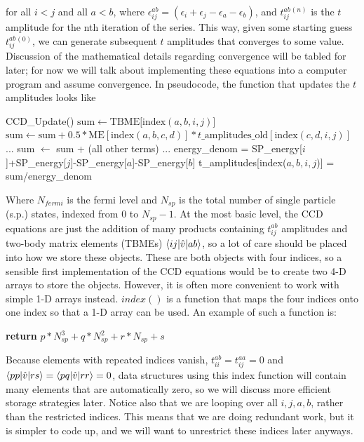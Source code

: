 for all $i < j$ and all $a < b$, where $\epsilon^{ab}_{ij} = \left(\epsilon_i+\epsilon_j-\epsilon_a-\epsilon_b\right)$, and $t_{ij}^{ab}{}^{(n)}$ is the $t$ amplitude for the nth iteration of the series. This way, given some starting guess $t_{ij}^{ab}{}^{(0)}$, we can generate subsequent $t$ amplitudes that converges to some value. Discussion of the mathematical details regarding convergence will be tabled for later; for now we will talk about implementing these equations into a computer program and assume convergence. In pseudocode, the function that updates the $t$ amplitudes looks like

\begin{algorithmic} 
\State CCD\_Update()
  \State $\text{sum} \gets \text{TBME}[\text{index}(a,b,i,j)$]
  \State $\text{sum} \gets \text{sum} + 0.5*\text{ME}[\text{index}(a,b,c,d)] * t\_\text{amplitudes}\_\text{old}[\text{index}(c,d,i,j)]$
  \EndFor
  \EndFor
  \State ...
  \State sum $\gets$ sum + (all other terms)
  \State ...
  \State energy\_denom = SP\_energy[$i$]+SP\_energy[$j$]-SP\_energy[$a$]-SP\_energy[$b$]
  \State t\_amplitudes[index($a,b,i,j$)] = sum/energy\_denom
  \EndFor
  \EndFor
  \EndFor
  \EndFor
\end{algorithmic}
Where $N_{fermi}$ is the fermi level and $N_{sp}$ is the total number of single particle (s.p.) states, indexed from 0 to $N_{sp}-1$. At the most basic level, the CCD equations are just the addition of many products containing $t_{ij}^{ab}$ amplitudes and two-body matrix elements (TBMEs) $\braket{ij|\hat{v}|ab}$, so a lot of care should be placed into how we store these objects. These are both objects with four indices, so a sensible first implementation of the CCD equations would be to create two 4-D arrays to store the objects. However, it is often more convenient to work with simple 1-D arrays instead. $index()$ is a function that maps the four indices onto one index so that a 1-D array can be used. An example of such a function is:
\begin{algorithmic}
\State \textbf{return} $p*N_{sp}^3 + q*N_{sp}^2 + r*N_{sp} + s$
\EndFunction
\end{algorithmic}
Because elements with repeated indices vanish, $t_{ii}^{ab}=t_{ij}^{aa}=0$ and $\braket{pp|\hat{v}|rs}=\braket{pq|\hat{v}|rr}=0$, data structures using this index function will contain many elements that are automatically zero, so we will discuss more efficient storage strategies later. Notice also that we are looping over all $i,j,a,b$, rather than the restricted indices. This means that we are doing redundant work, but it is simpler to code up, and we will want to unrestrict these indices later anyways.

